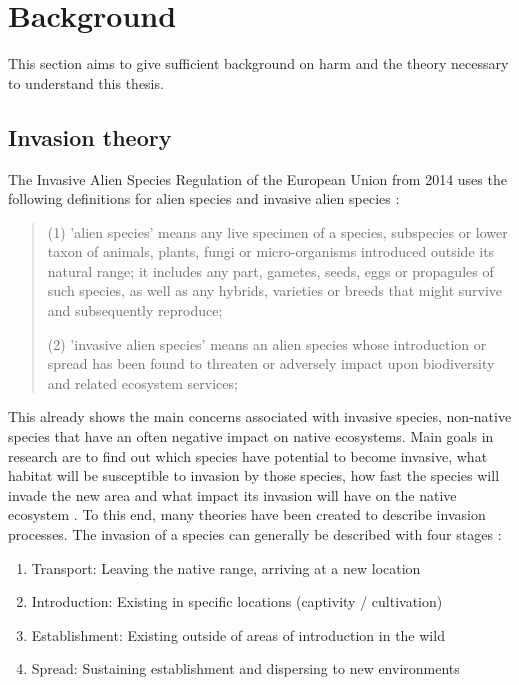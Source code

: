 \documentclass[12pt,a4paper]{article}
\begin{document}
\newpage
\section{Background}
This section aims to give sufficient background on \gls{harm} and the theory necessary to understand this thesis.

\subsection{Invasion theory}
The Invasive Alien Species Regulation of the European Union from 2014 uses the following definitions for alien species and invasive alien species \autocite{EU2014LexIAS}:
\begin{quote}
    (1) 'alien species' means any live specimen of a species, subspecies or lower taxon of animals, plants, fungi or micro-organisms introduced outside its natural range; it includes any part, gametes, seeds, eggs or propagules of such species, as well as any hybrids, varieties or breeds that might survive and subsequently reproduce;

    (2) 'invasive alien species' means an alien species whose introduction or spread has been found to threaten or adversely impact upon biodiversity and related ecosystem services;
\end{quote}

This already shows the main concerns associated with invasive species, non-native species that have an often negative impact on native ecosystems.
Main goals in research are to find out which species have potential to become invasive, what habitat will be susceptible to invasion by those species, how fast the species will invade the new area and what impact its invasion will have on the native ecosystem \autocite{shigesada1997invasions}.
To this end, many theories have been created to describe invasion processes.
The invasion of a species can  generally be described with four stages \autocite{blackburn2011invasionstages}:
\begin{enumerate}
    \item Transport: Leaving the native range, arriving at a new location
    \item Introduction: Existing in specific locations (captivity / cultivation)
    \item Establishment: Existing outside of areas of introduction in the wild
    \item Spread: Sustaining establishment and dispersing to new environments
\end{enumerate}
\end{document}
